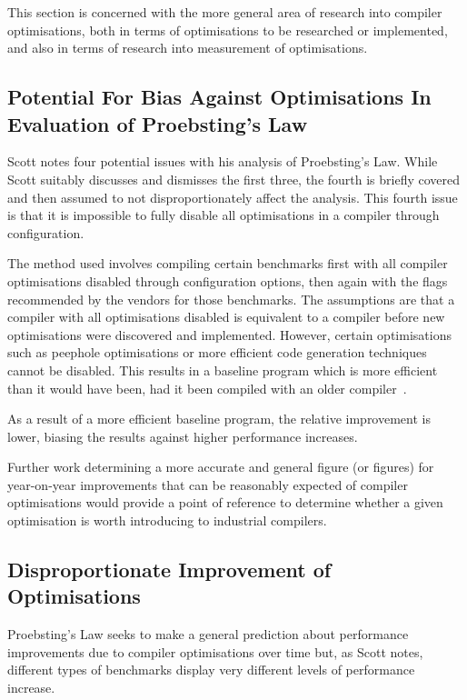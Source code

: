 This section is concerned with the more general area of research into compiler optimisations, both in terms of optimisations to be researched or implemented, and also in terms of research into measurement of optimisations.

\subsection{Potential For Bias Against Optimisations In Evaluation of Proebsting's Law}

Scott notes four potential issues with his analysis of Proebsting's Law. While Scott suitably discusses and dismisses the first three, the fourth is briefly covered and then assumed to not disproportionately affect the analysis. This fourth issue is that it is impossible to fully disable all optimisations in a compiler through configuration.

The method used involves compiling certain benchmarks first with all compiler optimisations disabled through configuration options, then again with the flags recommended by the vendors for those benchmarks. The assumptions are that a compiler with all optimisations disabled is equivalent to a compiler before new optimisations were discovered and implemented. However, certain optimisations such as peephole optimisations or more efficient code generation techniques cannot be disabled. This results in a baseline program which is more efficient than it would have been, had it been compiled with an older compiler~\cite{proebstingformal}.

As a result of a more efficient baseline program, the relative improvement is lower, biasing the results against higher performance increases.

Further work determining a more accurate and general figure (or figures) for year-on-year improvements that can be reasonably expected of compiler optimisations would provide a point of reference to determine whether a given optimisation is worth introducing to industrial compilers.

\subsection{Disproportionate Improvement of Optimisations}

Proebsting's Law seeks to make a general prediction about performance improvements due to compiler optimisations over time but, as Scott notes, different types of benchmarks display very different levels of performance increase.

